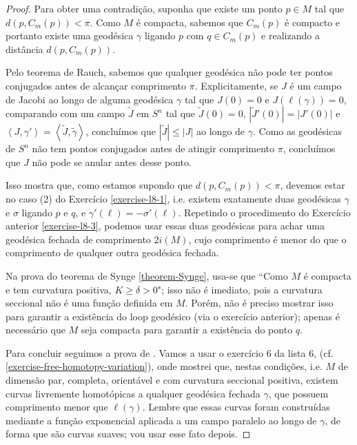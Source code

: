 \begin{proof}
Para obter uma contradição, suponha que
existe um ponto $p \in M$ tal que
 $d(p, C_m(p))<\pi$. Como $M$ é compacta,
 sabemos que $C_m(p)$ é compacto e
portanto existe uma geodésica $\gamma$
ligando $p$ com $q \in C_m(p)$ e
realizando a distância $d(p,C_m(p))$.

Pelo teorema de Rauch, sabemos que qualquer
geodésica não pode ter pontos
conjugados antes de alcançar comprimento
$\pi$. Explicitamente, se $J$ é um
campo de Jacobi ao longo de alguma geodésica
$\gamma$ tal que $J(0)=0$ e
$J(\ell(\gamma))=0$, comparando com um campo
$\tilde{J}$ em $S^n$ tal que
 $\tilde{J}(0)=0$, $|\tilde{J}'(0)|=|J'(0)|$
 e
$\left\langle{}J,\gamma'\right\rangle{}=\left\langle{}\tilde{J},
\tilde{\gamma}\right\rangle{}$,
concluímos que
 $|\tilde{J}|\leq |J|$ ao longo de $\gamma$.
 Como as geodésicas de $S^n$ não
 tem pontos conjugados antes de atingir
 comprimento $\pi$, concluímos que
$J$ não pode se anular antes desse ponto.

Isso mostra que, como estamos supondo que
$d(p,C_m(p))<\pi$, devemos estar no
caso (2) do Exercício \ref{exercise-l8-1},
i.e. existem exatamente duas
geodésicas $\gamma$ e $\sigma$ ligando $p$ e
$q$, e
$\gamma'(\ell)=-\sigma'(\ell)$. Repetindo o
procedimento do Exercício anterior
 \ref{exercise-l8-3}, podemos usar essas duas
 geodésicas para achar uma
geodésica fechada de comprimento $2i(M)$,
cujo comprimento é menor do que o
comprimento de qualquer outra geodésica
fechada.

\begin{remark}
\label{remark-curva-posit-impli-maior-que}
Na prova do teorema de Synge
\ref{theorem-Synge}, usa-se que ``Como $M$ é compacta e
tem curvatura positiva, $K\geq
\delta>0$"; isso não é imediato, pois
a curvatura seccional não é uma
função definida em $M$. Porém, não é preciso
mostrar isso para garantir a
existência do loop geodésico (via o exercício
anterior); apenas é necessário
que $M$ seja compacta para garantir a
existência do ponto $q$.
\end{remark}

\medskip

Para concluir seguimos a prova de \cite{doc}.
Vamos a usar o exercício 6 da
lista 6, (cf.
\ref{exercise-free-homotopy-variation}), onde
mostrei que, nestas condições, i.e.
$M$ de dimensão par, completa, orientável e
com curvatura seccional positiva,
existem curvas livremente homotópicas a
qualquer geodésica fechada $\gamma$, que
possuem comprimento menor que $\ell(\gamma)$.
Lembre que essas curvas foram
construídas mediante a função exponencial
aplicada a um campo paralelo ao longo
de $\gamma$, de forma que são curvas suaves;
vou usar esse fato depois.


\end{proof}
